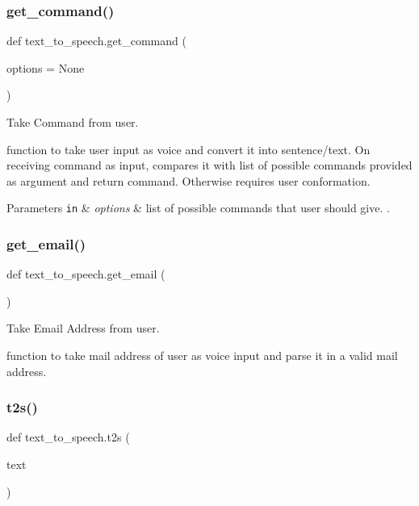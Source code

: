 \subsubsection{\texorpdfstring{get\+\_\+command()}{get\_command()}}
{\footnotesize\ttfamily def text\+\_\+to\+\_\+speech.\+get\+\_\+command (\begin{DoxyParamCaption}\item[{}]{options = {\ttfamily None} }\end{DoxyParamCaption})}



Take Command from user. 

function to take user input as voice and convert it into sentence/text. On receiving command as input, compares it with list of possible commands provided as argument and return command. Otherwise requires user conformation.


\begin{DoxyParams}[1]{Parameters}
\mbox{\tt in}  & {\em options} & list of possible commands that user should give. . \\
\hline
\end{DoxyParams}
\mbox{\label{namespacetext__to__speech_a12a2387847caabce244fa055014b2df2}} 
\subsubsection{\texorpdfstring{get\+\_\+email()}{get\_email()}}
{\footnotesize\ttfamily def text\+\_\+to\+\_\+speech.\+get\+\_\+email (\begin{DoxyParamCaption}{ }\end{DoxyParamCaption})}



Take Email Address from user. 

function to take mail address of user as voice input and parse it in a valid mail address. \mbox{\label{namespacetext__to__speech_a81e6ef88fc37db1c4c854a4ad56211f4}} 
\subsubsection{\texorpdfstring{t2s()}{t2s()}}
{\footnotesize\ttfamily def text\+\_\+to\+\_\+speech.\+t2s (\begin{DoxyParamCaption}\item[{}]{text }\end{DoxyParamCaption})}




